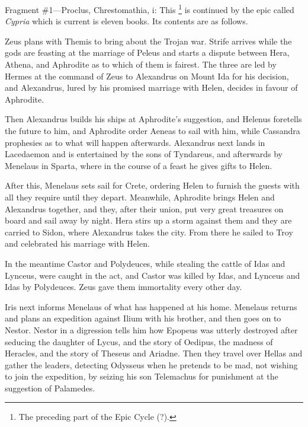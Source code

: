 
Fragment \#1—Proclus, Chrestomathia, i: This \footnote{The preceding part of the
Epic Cycle (?).} is
continued by the epic called \emph{Cypria} which is current is eleven
books. Its contents are as follows.

Zeus plans with Themis to bring about the Trojan war. Strife arrives while the
gods are feasting at the marriage of Peleus and starts a dispute between Hera,
Athena, and Aphrodite as to which of them is fairest. The three are led by
Hermes at the command of Zeus to Alexandrus on Mount Ida for his decision, and
Alexandrus, lured by his promised marriage with Helen, decides in favour of
Aphrodite.

Then Alexandrus builds his ships at Aphrodite’s suggestion, and Helenus
foretells the future to him, and Aphrodite order Aeneas to sail with him, while
Cassandra prophesies as to what will happen afterwards. Alexandrus next lands
in Lacedaemon and is entertained by the sons of Tyndareus, and afterwards by
Menelaus in Sparta, where in the course of a feast he gives gifts to Helen.

After this, Menelaus sets sail for Crete, ordering Helen to furnish the guests
with all they require until they depart. Meanwhile, Aphrodite brings Helen and
Alexandrus together, and they, after their union, put very great treasures on
board and sail away by night. Hera stirs up a storm against them and they are
carried to Sidon, where Alexandrus takes the city. From there he sailed to Troy
and celebrated his marriage with Helen.

In the meantime Castor and Polydeuces, while stealing the cattle of Idas and
Lynceus, were caught in the act, and Castor was killed by Idas, and Lynceus and
Idas by Polydeuces. Zeus gave them immortality every other day.

Iris next informs Menelaus of what has happened at his home. Menelaus returns
and plans an expedition against Ilium with his brother, and then goes on to
Nestor. Nestor in a digression tells him how Epopeus was utterly destroyed
after seducing the daughter of Lycus, and the story of Oedipus, the madness of
Heracles, and the story of Theseus and Ariadne. Then they travel over Hellas
and gather the leaders, detecting Odysseus when he pretends to be mad, not
wishing to join the expedition, by seizing his son Telemachus for punishment at
the suggestion of Palamedes.

